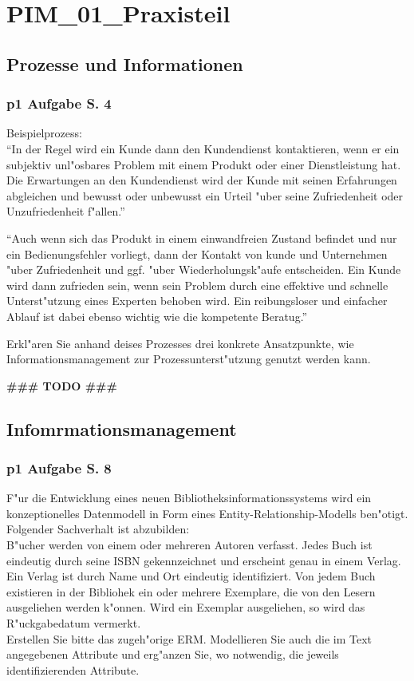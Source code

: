 
\section{PIM\_01\_Praxisteil}


\subsection{Prozesse und Informationen}

\subsubsection{p1 Aufgabe S. 4}

Beispielprozess:\\
"`In der Regel wird ein Kunde dann den Kundendienst kontaktieren, wenn er ein subjektiv unl"osbares Problem mit einem Produkt oder einer Dienstleistung hat.
Die Erwartungen an den Kundendienst wird der Kunde mit seinen Erfahrungen abgleichen und bewusst oder unbewusst ein Urteil "uber seine Zufriedenheit oder Unzufriedenheit f"allen."'
\par
"`Auch wenn sich das Produkt in einem einwandfreien Zustand befindet und nur ein Bedienungsfehler vorliegt, dann der Kontakt von kunde und Unternehmen "uber Zufriedenheit und ggf. "uber Wiederholungsk"aufe entscheiden.
Ein Kunde wird dann zufrieden sein, wenn sein Problem durch eine effektive und schnelle Unterst"utzung eines Experten behoben wird.
Ein reibungsloser und einfacher Ablauf ist dabei ebenso wichtig wie die kompetente Beratug."'
\par
Erkl"aren Sie anhand deises Prozesses drei konkrete Ansatzpunkte, wie Informationsmanagement zur Prozessunterst"utzung genutzt werden kann.


\textbf{\#\#\# TODO \#\#\#}\\



\subsection{Infomrmationsmanagement}

\subsubsection{p1 Aufgabe S. 8}

F"ur die Entwicklung eines neuen Bibliotheksinformationssystems wird ein konzeptionelles Datenmodell in Form eines Entity-Relationship-Modells ben"otigt.
Folgender Sachverhalt ist abzubilden:\\
B"ucher werden von einem oder mehreren Autoren verfasst.
Jedes Buch ist eindeutig durch seine ISBN gekennzeichnet und erscheint genau in einem Verlag.
Ein Verlag ist durch Name und Ort eindeutig identifiziert.
Von jedem Buch existieren in der Bibliohek ein oder mehrere Exemplare, die von den Lesern ausgeliehen werden k"onnen.
Wird ein Exemplar ausgeliehen, so wird das R"uckgabedatum vermerkt.\\
Erstellen Sie bitte das zugeh"orige ERM.
Modellieren Sie auch die im Text angegebenen Attribute und erg"anzen Sie, wo notwendig, die jeweils identifizierenden Attribute.


